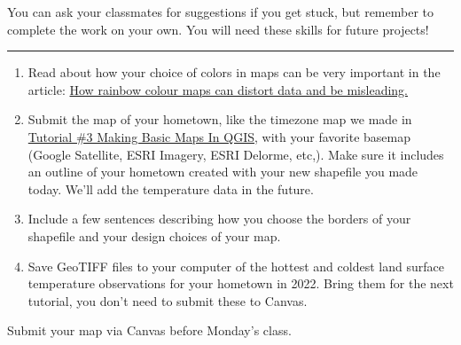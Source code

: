 \documentclass[oneside,a4paper,11pt,explicit]{book}
\begin{document}
You can ask your classmates for suggestions if you get stuck, but remember to complete the work on your own. You will need these skills for future projects!
	
	
	
	\vspace{.25em}
	
	\hrule
	
	\vspace{1 em}
	
	\begin{tcolorbox}[colback=yellow!5!white,colframe=red!80!blue,title= \vspace{.2em} \Large Map of the Week Assignments]
		\large
		\begin{enumerate}
			\item Read about how your choice of colors in maps can be very important in the article: \href{https://theconversation.com/how-rainbow-colour-maps-can-distort-data-and-be-misleading-167159}{How rainbow colour maps can distort data and be misleading.}
			\item Submit the map of your hometown, like the timezone map we made in \href{https://jeremydforsythe.github.io/icecream-tutorials/Tutorial3_MakingBasicMapsInQGIS/Tutorial3_MakingBasicMapsInQGIS.pdf}{Tutorial \#3 Making Basic Maps In QGIS}, with your favorite basemap (Google Satellite, ESRI Imagery, ESRI Delorme, etc,). Make sure it includes an outline of your hometown created with your new shapefile you made today. We'll add the temperature data in the future.  
			\item Include a few sentences describing how you choose the borders of your shapefile and your design choices of your map. 
			\item Save GeoTIFF files to your computer of the hottest and coldest land surface temperature observations for your hometown in 2022. Bring them for the next tutorial, you don't need to submit these to Canvas.
		\end{enumerate}
		
		Submit your map via Canvas before Monday's class.
	\end{tcolorbox}
	
\end{document}

